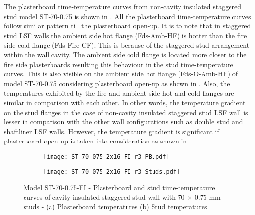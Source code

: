 The plasterboard time-temperature curves from non-cavity insulated staggered stud model ST-70-0.75 is shown in . All the plasterboard time-temperature curves follow similar pattern till the plasterboard open-up. It is to note that in staggered stud LSF walls the ambient side hot flange (Fds-Amb-HF) is hotter than the fire side cold flange (Fds-Fire-CF). This is because of the staggered stud arrangement within the wall cavity. The ambient side cold flange is located more closer to the fire side plasterboards resulting this behaviour in the stud time-temperature curves. This is also visible on the ambient side hot flange (Fds-O-Amb-HF) of model ST-70-0.75 considering plasterboard open-up as shown in . Also, the temperatures exhibited by the fire and ambient side hot and cold flanges are similar in comparison with each other. In other words, the temperature gradient on the stud flanges in the case of non-cavity insulated staggered stud LSF wall is lesser in comparison with the other wall configurations such as double stud and shaftliner LSF walls. However, the temperature gradient is significant if plasterboard open-up is taken into consideration as shown in .   
\begin{figure}[!htbp]
	\centering
	\begin{subfigure}[b]{0.6\textwidth}
		\centering
		\texttt{[image: ST-70-075-2x16-FI-r3-PB.pdf]}
		\caption{}
		\label{subfig:ST-70-075-2x16-FI-r3-PB}
	\end{subfigure}
	\begin{subfigure}[b]{0.6\textwidth}
		\centering
		\texttt{[image: ST-70-075-2x16-FI-r3-Studs.pdf]}
		\caption{}
		\label{subfig:ST-70-075-2x16-FI-r3-Studs}
	\end{subfigure}
	   \caption{Model ST-70-0.75-FI - Plasterboard and stud time-temperature curves of cavity insulated staggered stud wall with 70 $\times$ 0.75 mm studs - (a) Plasterboard temperatures (b) Stud temperatures}
	   \label{fig:ST-70-075-2x16-FI-r3}
\end{figure}

